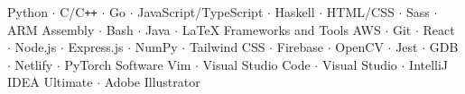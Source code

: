 

\begin{cvskills}
	{Python $\cdot$ C/C\texttt{++} $\cdot$ Go $\cdot$ JavaScript/TypeScript $\cdot$ Haskell $\cdot$ HTML/CSS $\cdot$ Sass $\cdot$ ARM Assembly $\cdot$ Bash $\cdot$ Java $\cdot$ \LaTeX}
	\cvskill
	{Frameworks and Tools}
	{AWS $\cdot$ Git $\cdot$ React $\cdot$ Node.js $\cdot$ Express.js $\cdot$ NumPy $\cdot$ Tailwind CSS $\cdot$ Firebase $\cdot$ OpenCV $\cdot$ Jest $\cdot$ GDB $\cdot$ Netlify $\cdot$ PyTorch}
	\cvskill
	{Software}
	{Vim $\cdot$ Visual Studio Code $\cdot$ Visual Studio $\cdot$ IntelliJ IDEA Ultimate $\cdot$ Adobe Illustrator} 
\end{cvskills}